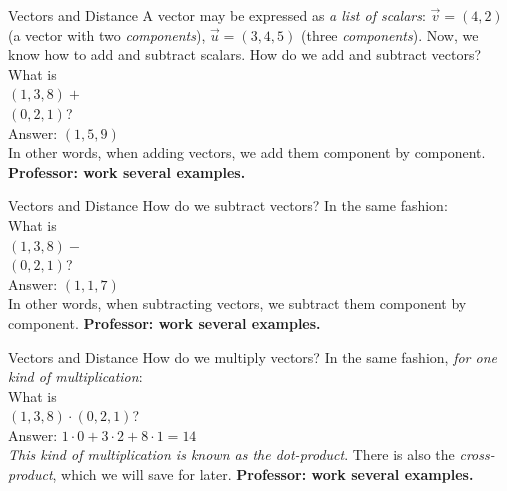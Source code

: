 \documentclass{beamer}
\begin{document}
\begin{frame}{Vectors and Distance}
A vector may be expressed as \textit{a list of scalars}: $\vec{v} = (4,2)$ (a vector with two \textit{components}), $\vec{u} = (3,4,5)$ (three \textit{components}).  Now, we know how to add and subtract scalars.  How do we add and subtract vectors? \\
\vspace{0.5cm}
What is\\
$(1,3,8)+$\\ $(0,2,1)$? \\
Answer: $(1,5,9)$ \\
\vspace{0.5cm}
In other words, when adding vectors, we add them component by component. \textbf{Professor: work several examples.}
\end{frame}

\begin{frame}{Vectors and Distance}
How do we subtract vectors? In the same fashion:\\
\vspace{0.5cm}
What is\\
$(1,3,8)-$\\ $(0,2,1)$? \\
Answer: $(1,1,7)$ \\
\vspace{0.5cm}
In other words, when subtracting vectors, we subtract them component by component. \textbf{Professor: work several examples.}
\end{frame}

\begin{frame}{Vectors and Distance}
How do we multiply vectors? In the same fashion, \textit{for one kind of multiplication}:\\
\vspace{0.5cm}
What is\\
$(1,3,8)\cdot (0,2,1)$? \\
Answer: $1\cdot 0 + 3 \cdot 2 + 8 \cdot 1 = 14$ \\
\vspace{0.5cm}
\textit{This kind of multiplication is known as the dot-product}.  There is also the \textit{cross-product}, which we will save for later. \textbf{Professor: work several examples.}
\end{frame}
\end{document}
